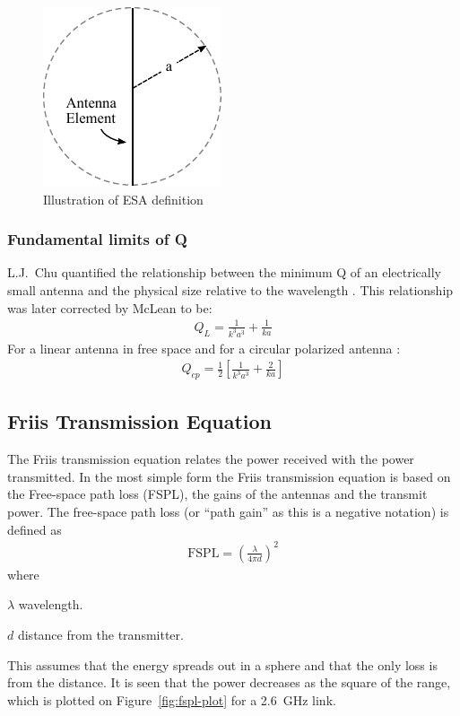 \begin{figure}[htbp]
  \centering
  \includegraphics[scale=1]{img/analysis/ESA}
  \caption{Illustration of ESA definition \cite{}}
  \label{fig:ant-esa-def}
\end{figure}


\subsubsection{Fundamental limits of Q}
L.J.\ Chu quantified the relationship between the minimum Q of an electrically small antenna and the physical size relative to the wavelength \cite{chu1948}. This relationship was later corrected by McLean \cite{mclean1996} to be: 
\begin{align}
  Q_L = \frac{1}{k^3a^3}+ \frac{1}{ka}
\end{align}
For a linear antenna in free space and for a circular polarized antenna \cite{mclean1996}:
\begin{align}
  Q_{cp} = \frac{1}{2}  \left[ \frac{1}{k^3a^3} + \frac{2}{ka} \right] 
\end{align}

\subsection{Friis Transmission Equation}
The Friis transmission equation relates the power received with the power transmitted. In the most simple form the Friis transmission equation is based on the Free-space path loss (FSPL), the gains of the antennas and the transmit power. The free-space path loss (or ``path gain'' as this is a negative notation) is defined as \cite{balanis2012antenna}
\begin{align}
  \label{eq:fspl}
  \text{FSPL} = \left( \frac{\lambda}{4 \pi d} \right)^2 
\end{align}
where
\begin{where}
\item[$\lambda$] wavelength.
\item[$d$] distance from the transmitter.
\end{where}
This assumes that the energy spreads out in a sphere and that the only loss is from the distance. It is seen that the power decreases as the square of the range, which is plotted on Figure~\ref{fig:fspl-plot} for a \SI{2.6}{GHz} link.

